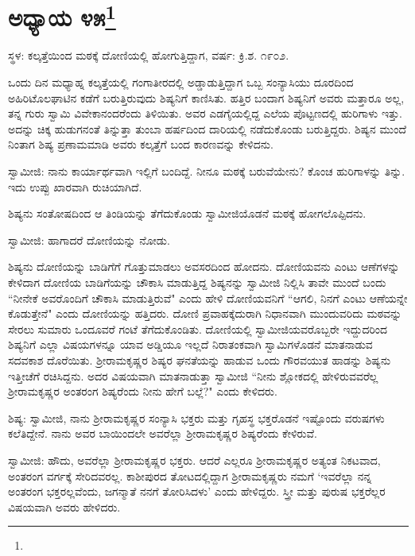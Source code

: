 \newpage

\chapter[ಅಧ್ಯಾಯ ೪೫]{ಅಧ್ಯಾಯ ೪೫\protect\footnote{}}

\begin{center}
ಸ್ಥಳ: ಕಲ್ಕತ್ತೆಯಿಂದ ಮಠಕ್ಕೆ ದೋಣಿಯಲ್ಲಿ ಹೋಗುತ್ತಿದ್ದಾಗ, ವರ್ಷ: ಕ್ರಿ.ಶ. ೧೯೦೨.
\end{center}

ಒಂದು ದಿನ ಮಧ್ಯಾಹ್ನ ಕಲ್ಕತ್ತೆಯಲ್ಲಿ ಗಂಗಾತೀರದಲ್ಲಿ ಅಡ್ಡಾಡುತ್ತಿದ್ದಾಗ ಒಬ್ಬ ಸಂನ್ಯಾಸಿಯು ದೂರದಿಂದ ಅಹಿರಿಟೊಲಘಾಟಿನ ಕಡೆಗೆ ಬರುತ್ತಿರುವುದು ಶಿಷ್ಯನಿಗೆ ಕಾಣಿಸಿತು. ಹತ್ತಿರ ಬಂದಾಗ ಶಿಷ್ಯನಿಗೆ ಅವರು ಮತ್ತಾರೂ ಅಲ್ಲ, ತನ್ನ ಗುರು ಸ್ವಾಮಿ ವಿವೇಕಾನಂದರೆಂದು ತಿಳಿಯಿತು. ಅವರ ಎಡಗೈಯಲ್ಲಿದ್ದ ಎಲೆಯ ಪೊಟ್ಟಣದಲ್ಲಿ ಹುರಿಗಾಳು ಇತ್ತು. ಅದನ್ನು ಚಿಕ್ಕ ಹುಡುಗನಂತೆ ತಿನ್ನುತ್ತಾ ತುಂಬಾ ಹರ್ಷದಿಂದ ದಾರಿಯಲ್ಲಿ ನಡೆದುಕೊಂಡು ಬರುತ್ತಿದ್ದರು. ಶಿಷ್ಯನ ಮುಂದೆ ನಿಂತಾಗ ಶಿಷ್ಯ ಪ್ರಣಾಮಮಾಡಿ ಅವರು ಕಲ್ಕತ್ತೆಗೆ ಬಂದ ಕಾರಣವನ್ನು ಕೇಳಿದನು.

ಸ್ವಾಮೀಜಿ: ನಾನು ಕಾರ್ಯಾರ್ಥವಾಗಿ ಇಲ್ಲಿಗೆ ಬಂದಿದ್ದೆ. ನೀನೂ ಮಠಕ್ಕೆ ಬರುವೆಯೇನು? ಕೊಂಚ ಹುರಿಗಾಳನ್ನು ತಿನ್ನು. ಇದು ಉಪ್ಪು ಖಾರವಾಗಿ ರುಚಿಯಾಗಿದೆ.

ಶಿಷ್ಯನು ಸಂತೋಷದಿಂದ ಆ ತಿಂಡಿಯನ್ನು ತೆಗೆದುಕೊಂಡು ಸ್ವಾಮೀಜಿಯೊಡನೆ ಮಠಕ್ಕೆ ಹೋಗಲೊಪ್ಪಿದನು.

ಸ್ವಾಮೀಜಿ: ಹಾಗಾದರೆ ದೋಣಿಯನ್ನು ನೋಡು.

ಶಿಷ್ಯನು ದೋಣಿಯನ್ನು ಬಾಡಿಗೆಗೆ ಗೊತ್ತುಮಾಡಲು ಅವಸರದಿಂದ ಹೋದನು. ದೋಣಿಯವನು ಎಂಟು ಆಣೆಗಳನ್ನು ಕೇಳಿದಾಗ ದೋಣಿಯ ಬಾಡಿಗೆಯನ್ನು ಚೌಕಾಸಿ ಮಾಡುತ್ತಿದ್ದ ಶಿಷ್ಯನನ್ನು ಸ್ವಾಮೀಜಿ ನಿಲ್ಲಿಸಿ ತಾವೇ ಮುಂದೆ ಬಂದು “ನೀನೇಕೆ ಅವರೊಂದಿಗೆ ಚೌಕಾಸಿ ಮಾಡುತ್ತಿರುವೆ" ಎಂದು ಹೇಳಿ ದೋಣಿಯವನಿಗೆ “ಆಗಲಿ, ನಿನಗೆ ಎಂಟು ಆಣೆಯನ್ನೇ ಕೊಡುತ್ತೇನೆ" ಎಂದು ದೋಣಿಯನ್ನು ಹತ್ತಿದರು. ದೋಣಿ ಪ್ರವಾಹಕ್ಕೆದುರಾಗಿ ನಿಧಾನವಾಗಿ ಮುಂದುವರಿದು ಮಠವನ್ನು ಸೇರಲು ಸುಮಾರು ಒಂದೂವರೆ ಗಂಟೆ ತೆಗೆದುಕೊಂಡಿತು. ದೋಣಿಯಲ್ಲಿ ಸ್ವಾಮೀಜಿಯವರೊಬ್ಬರೇ ಇದ್ದುದರಿಂದ ಶಿಷ್ಯನಿಗೆ ಎಲ್ಲಾ ವಿಷಯಗಳನ್ನೂ ಯಾವ ಅಡ್ಡಿಯೂ ಇಲ್ಲದೆ ನಿರಾತಂಕವಾಗಿ ಸ್ವಾಮಿಗಳೊಡನೆ ಮಾತನಾಡುವ ಸದವಕಾಶ ದೊರೆಯಿತು. ಶ‍್ರೀರಾಮಕೃಷ್ಣರ ಶಿಷ್ಯರ ಘನತೆಯನ್ನು ಹಾಡುವ ಒಂದು ಗೌರವಯುತ ಹಾಡನ್ನು ಶಿಷ್ಯನು ಇತ್ತೀಚೆಗೆ ರಚಿಸಿದ್ದನು. ಅದರ ವಿಷಯವಾಗಿ ಮಾತನಾಡುತ್ತಾ ಸ್ವಾಮೀಜಿ “ನೀನು ಶ್ಲೋಕದಲ್ಲಿ ಹೇಳಿರುವವರೆಲ್ಲ ಶ‍್ರೀರಾಮಕೃಷ್ಣರ ಅಂತರಂಗ ಶಿಷ್ಯರೆಂದು ನೀನು ಹೇಗೆ ಬಲ್ಲೆ?" ಎಂದು ಕೇಳಿದರು.

ಶಿಷ್ಯ: ಸ್ವಾಮೀಜಿ, ನಾನು ಶ‍್ರೀರಾಮಕೃಷ್ಣರ ಸಂನ್ಯಾಸಿ ಭಕ್ತರು ಮತ್ತು ಗೃಹಸ್ಥ ಭಕ್ತರೊಡನೆ ಇಷ್ಟೊಂದು ವರುಷಗಳು ಕಲೆತಿದ್ದೇನೆ. ನಾನು ಅವರ ಬಾಯಿಂದಲೇ ಅವರೆಲ್ಲಾ ಶ‍್ರೀರಾಮಕೃಷ್ಣರ ಶಿಷ್ಯರೆಂದು ಕೇಳಿರುವೆ.

ಸ್ವಾಮೀಜಿ: ಹೌದು, ಅವರೆಲ್ಲಾ ಶ‍್ರೀರಾಮಕೃಷ್ಣರ ಭಕ್ತರು. ಆದರೆ ಎಲ್ಲರೂ ಶ‍್ರೀರಾಮಕೃಷ್ಣರ ಅತ್ಯಂತ ನಿಕಟವಾದ, ಅಂತರಂಗ ವರ್ಗಕ್ಕೆ ಸೇರಿದವರಲ್ಲ. ಕಾಶೀಪುರದ ತೋಟದಲ್ಲಿದ್ದಾಗ ಶ‍್ರೀರಾಮಕೃಷ್ಣರು ನಮಗೆ ‘ಇವರೆಲ್ಲಾ ನನ್ನ ಅಂತರಂಗ ಭಕ್ತರಲ್ಲವೆಂದು, ಜಗನ್ಮಾತೆ ನನಗೆ ತೋರಿಸಿದಳು’ ಎಂದು ಹೇಳಿದ್ದರು. ಸ್ತ್ರೀ ಮತ್ತು ಪುರುಷ ಭಕ್ತರೆಲ್ಲರ ವಿಷಯವಾಗಿ ಅವರು ಹೇಳಿದರು.

